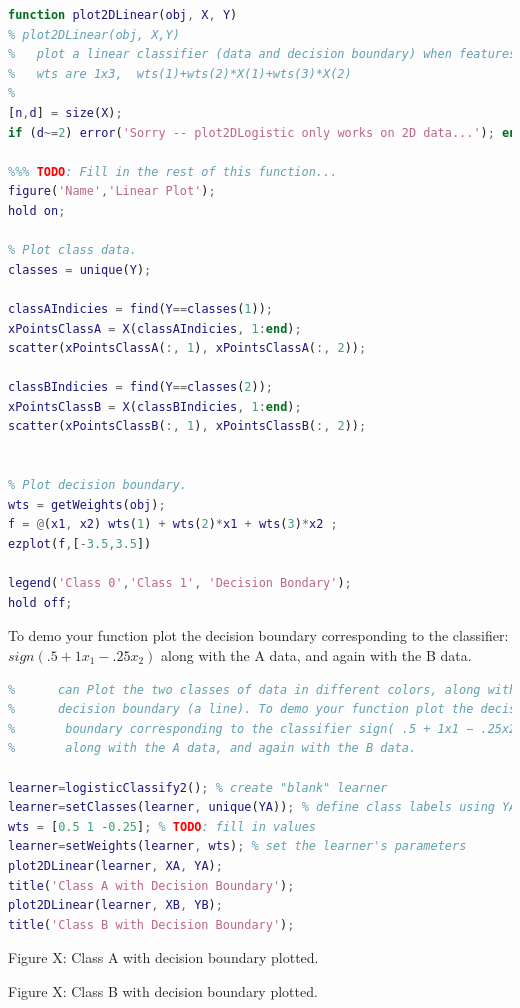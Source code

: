 \documentclass[]{report}   %
\begin{document}
\begin{lstlisting}[language=Matlab, caption=plot2DLinear() Implementation]
function plot2DLinear(obj, X, Y)
% plot2DLinear(obj, X,Y)
%   plot a linear classifier (data and decision boundary) when features X are 2-dim
%   wts are 1x3,  wts(1)+wts(2)*X(1)+wts(3)*X(2)
%
[n,d] = size(X);
if (d~=2) error('Sorry -- plot2DLogistic only works on 2D data...'); end;

%%% TODO: Fill in the rest of this function...
figure('Name','Linear Plot');
hold on;

% Plot class data.
classes = unique(Y);

classAIndicies = find(Y==classes(1));
xPointsClassA = X(classAIndicies, 1:end);
scatter(xPointsClassA(:, 1), xPointsClassA(:, 2));

classBIndicies = find(Y==classes(2));
xPointsClassB = X(classBIndicies, 1:end);
scatter(xPointsClassB(:, 1), xPointsClassB(:, 2));


% Plot decision boundary.
wts = getWeights(obj);
f = @(x1, x2) wts(1) + wts(2)*x1 + wts(3)*x2 ;
ezplot(f,[-3.5,3.5])

legend('Class 0','Class 1', 'Decision Bondary');
hold off;
\end{lstlisting}
{To demo your function plot the decision boundary corresponding to the classifier: $sign( .5 + 1x_{1} − .25x_{2} )$ along with the A data, and again with the B data.}
\begin{lstlisting}[language=Matlab, caption=Demoing plot2DLinear()]
%% (B) Write the function @logisticClassify2/plot2DLinear.m such that it 
%      can Plot the two classes of data in different colors, along with the 
%      decision boundary (a line). To demo your function plot the decision 
%       boundary corresponding to the classifier sign( .5 + 1x1 − .25x2 )
%       along with the A data, and again with the B data.

learner=logisticClassify2(); % create "blank" learner
learner=setClasses(learner, unique(YA)); % define class labels using YA or YB
wts = [0.5 1 -0.25]; % TODO: fill in values
learner=setWeights(learner, wts); % set the learner's parameters
plot2DLinear(learner, XA, YA);
title('Class A with Decision Boundary');
plot2DLinear(learner, XB, YB);
title('Class B with Decision Boundary');
\end{lstlisting}
\begin{center}
	{Figure X: Class A with decision boundary plotted.}
\end{center} 
\begin{center}
	{Figure X: Class B with decision boundary plotted.}
\end{center} 
\end{document}
